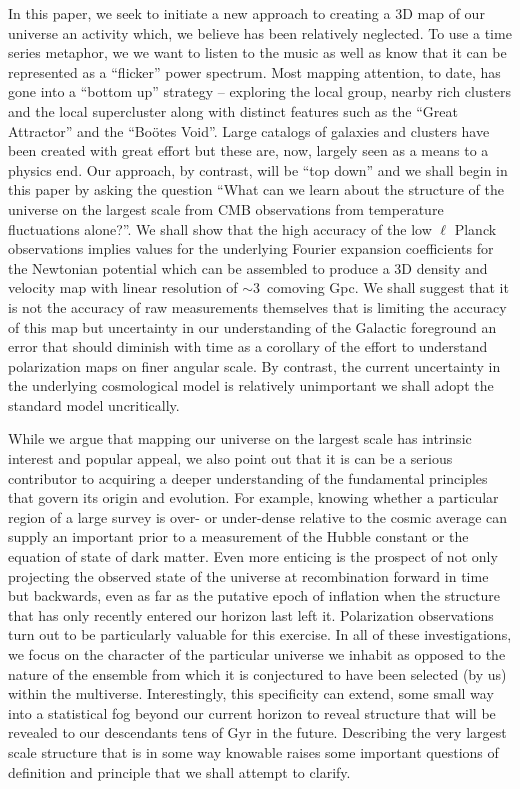 \documentclass[useAMS,usenatbib,a4paper]{mn2e}
\begin{document}
In this paper, we seek to initiate a new approach to creating a 3D map
of our universe an activity which, we believe has been relatively
neglected. To use a time series metaphor, we we want to listen to the
music as well as know that it can be represented as a ``flicker''
power spectrum. Most mapping attention, to date, has gone into a
``bottom up'' strategy -- exploring the local group, nearby rich
clusters and the local supercluster along with distinct features such
as the ``Great Attractor'' and the ``Bo\"otes Void''. Large catalogs
of galaxies and clusters have been created with great effort but these
are, now, largely seen as a means to a physics end. Our approach, by
contrast, will be ``top down'' and we shall begin in this paper by
asking the question ``What can we learn about the structure of the
universe on the largest scale from CMB observations from temperature
fluctuations alone?''. We shall show that the high accuracy of the low
$\ell$ Planck observations implies values for the underlying Fourier
expansion coefficients for the Newtonian potential which can be
assembled to produce a 3D density and velocity map with linear
resolution of $\sim3$~comoving Gpc. We shall suggest that it is not
the accuracy of raw measurements themselves that is limiting the
accuracy of this map but uncertainty in our understanding of the
Galactic foreground an error that should diminish with time as a
corollary of the effort to understand polarization maps on finer
angular scale. By contrast, the current uncertainty in the underlying
cosmological model is relatively unimportant we shall adopt the
standard model uncritically.

While we argue that mapping our universe on the largest scale has
intrinsic interest and popular appeal, we also point out that it is
can be a serious contributor to acquiring a deeper understanding of
the fundamental principles that govern its origin and evolution. For
example, knowing whether a particular region of a large survey is
over- or under-dense relative to the cosmic average can supply an
important prior to a measurement of the Hubble constant or the
equation of state of dark matter. Even more enticing is the prospect
of not only projecting the observed state of the universe at
recombination forward in time but backwards, even as far as the
putative epoch of inflation when the structure that has only recently
entered our horizon last left it. Polarization observations turn out
to be particularly valuable for this exercise. In all of these
investigations, we focus on the character of the particular universe
we inhabit as opposed to the nature of the ensemble from which it is
conjectured to have been selected (by us) within the multiverse.
Interestingly, this specificity can extend, some small way into a
statistical fog beyond our current horizon to reveal structure that
will be revealed to our descendants tens of Gyr in the future.
Describing the very largest scale structure that is in some way
knowable raises some important questions of definition and principle
that we shall attempt to clarify.
\end{document}
